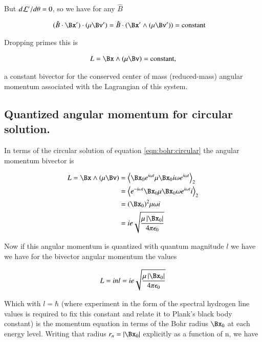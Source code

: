 But $d\mathcal{L}'/d\theta = 0$, so we have for any $\hat{B}$

\begin{align*}
(\hat{B} \cdot \Bx') \cdot (\mu \Bv') &= \hat{B} \cdot (\Bx' \wedge (\mu \Bv')) = \text{constant}
\end{align*}

Dropping primes this is

\begin{align*}
L = \Bx \wedge (\mu \Bv) = \text{constant},
\end{align*}

a constant bivector for the conserved center of mass (reduced-mass) angular momentum associated with the Lagrangian of this system.

\subsection{Quantized angular momentum for circular solution. }

In terms of the circular solution of equation \ref{eqn:bohr:circular} the angular momentum bivector is

\begin{align*}
L = \Bx \wedge (\mu \Bv) 
&= \gpgradetwo{ \Bx_0 e^{i \omega t} \mu \Bx_0 i \omega e^{i \omega t} } \\
&= \gpgradetwo{ e^{-i \omega t} \Bx_0 \mu \Bx_0 \omega e^{i \omega t} i } \\
&= (\Bx_0)^2 \mu \omega i \\
&= i e \sqrt{\frac{\mu \Abs{\Bx_0}}{4 \pi \epsilon_0}}
\end{align*}


Now if this angular momentum is quantized with quantum magnitude $l$ we have we have for the bivector angular momentum the values

\begin{align}
L = i n l = i e \sqrt{\frac{\mu \Abs{\Bx_0}}{4 \pi \epsilon_0}}
\end{align}

Which with $l = \hbar$ (where experiment in the form of the spectral hydrogen line values is required to fix this constant and relate it to Plank's black body constant)
is the momentum equation in terms of
the Bohr radius $\Bx_0$ at each energy level.  Writing that radius $r_n = \Abs{\Bx_0}$ explicitly as a function of n, we have

